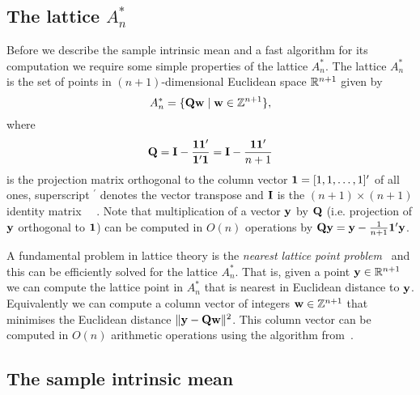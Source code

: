 \documentclass[journal]{IEEEtran}
\begin{document}
\subsection{The lattice $A_n^*$}

Before we describe the sample intrinsic mean and a fast algorithm for its computation we require some simple properties of the lattice $A_n^*$.   The lattice $A_n^*$ is the set of points in $(n+1)$-dimensional Euclidean space ${\mathbb R}^{n+1}$ given by
\[
A_n^* = \{ \mathbf{Q} \mathbf{w} \mid \mathbf{w} \in {\mathbb Z}^{n+1} \},
\]
where
\begin{equation}\label{eq:Qproj}
\Qbf = \Ibf - \frac{\onebf\onebf^\prime}{\onebf^\prime\onebf} = \Ibf - \frac{\onebf\onebf^\prime}{n+1}
\end{equation}
is the projection matrix orthogonal to the column vector $\boldsymbol{1} = [1,1,\dots,1]^{\prime}$ of all ones,  superscript $^\prime$ denotes the vector transpose and $\mathbf{I}$ is the $(n+1) \times (n+1)$ identity matrix ~\cite{McKilliam2010thesis,McKilliam2009CoxeterLattices,McKilliam2008}~\cite[p. 115]{SPLAG}.  Note that multiplication of a vector $\mathbf{y}$ by $\mathbf{Q}$ (i.e. projection of $\mathbf{y}$ orthogonal to $\boldsymbol{1}$) can be computed in $O(n)$ operations by $\mathbf{Q}\mathbf{y} = \mathbf{y} - \frac{1}{n+1}\boldsymbol{1}^\prime \mathbf{y}$.

A fundamental problem in lattice theory is the \emph{nearest lattice point problem}~\cite{Agrell2002} and this can be efficiently solved for the lattice $A_n^*$.  That is, given a point $\mathbf{y}\in{\mathbb R}^{n+1}$ we can compute the lattice point in $A_n^*$ that is nearest in Euclidean distance to $\mathbf{y}$.  Equivalently we can compute a column vector of integers $\mathbf{w} \in {\mathbb Z}^{n+1}$ that minimises the Euclidean distance $\|\mathbf{y} - \mathbf{Q}\mathbf{w}\|^2$.  This column vector can be computed in $O(n)$ arithmetic operations using the algorithm from~\cite{McKilliam2009CoxeterLattices}\cite[Ch. 3]{McKilliam2010thesis}.

\subsection{The sample intrinsic mean}\label{sec:angul-least-squar}
\end{document}
